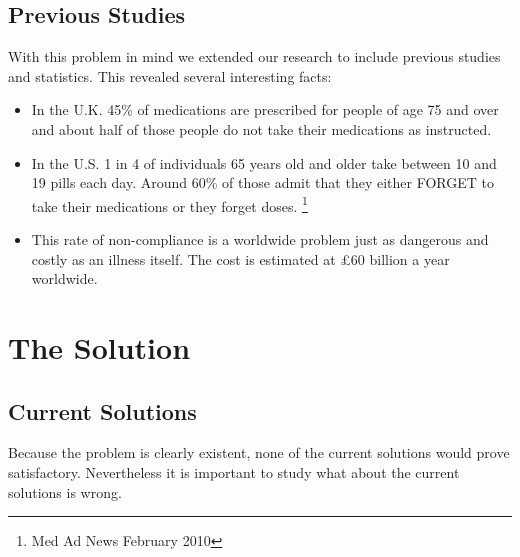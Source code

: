 \documentclass{article}
\begin{document}
	\subsection{Previous Studies}
	With this problem in mind we extended our research to include previous studies and statistics. This revealed several interesting facts:
	\begin{itemize}
	\item In the U.K. 45\% of medications are prescribed for people of age 75 and over and about half of those people do not take their medications as instructed. 
	\item In the U.S. 1 in 4 of individuals 65 years old and older take between 10 and 19 pills each day. Around 60\% of those admit that they either FORGET to take their medications or they forget doses. \footnote{Med Ad News February 2010}
	\item This rate of non-compliance is a worldwide problem just as dangerous and costly as an illness itself. The cost is estimated at £60 billion a year worldwide.
	\end{itemize}


\section{The Solution}
	\subsection{Current Solutions}
	Because the problem is clearly existent, none of the current solutions would prove satisfactory. Nevertheless it is important to study what about the current solutions is wrong.
\end{document}
